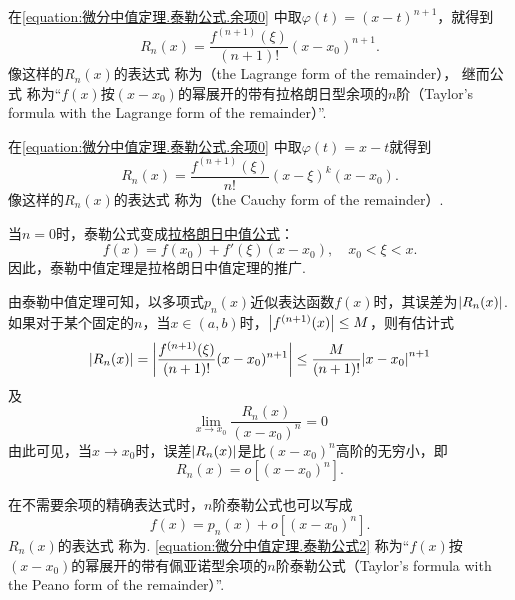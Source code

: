 在\cref{equation:微分中值定理.泰勒公式.余项0} 中取\(\varphi(t) = (x-t)^{n+1}\)，就得到
\begin{equation}\label{equation:微分中值定理.泰勒公式.余项1}
R_n(x) = \frac{f^{(n+1)}(\xi)}{(n+1)!} (x-x_0)^{n+1}.
\end{equation}
像这样的\(R_n(x)\)的表达式  称为（the Lagrange form of the remainder），
继而公式  称为“\(f(x)\)按\((x-x_0)\)的幂展开的带有拉格朗日型余项的\(n\)阶（Taylor's formula with the Lagrange form of the remainder）”.

在\cref{equation:微分中值定理.泰勒公式.余项0} 中取\(\varphi(t) = x-t\)就得到
\begin{equation}\label{equation:微分中值定理.泰勒公式.余项4}
R_n(x) = \frac{f^{(n+1)}(\xi)}{n!} (x-\xi)^k (x-x_0).
\end{equation}
像这样的\(R_n(x)\)的表达式  称为（the Cauchy form of the remainder）.

当\(n=0\)时，泰勒公式变成\hyperref[equation:微分中值定理.拉格朗日中值公式]{拉格朗日中值公式}：\[
f(x) = f(x_0) + f'(\xi) (x-x_0), \quad x_0 < \xi < x.
\]因此，泰勒中值定理是拉格朗日中值定理的推广.

由泰勒中值定理可知，以多项式\(p_n(x)\)近似表达函数\(f(x)\)时，其误差为\(\abs{R_n(x)}\).如果对于某个固定的\(n\)，当\(x\in(a,b)\)时，\(\abs{f^{(n+1)}(x)} \leq M\)，则有估计式\begin{equation}\label{equation:微分中值定理.泰勒公式.误差1}
\abs{R_n(x)}
= \abs{\frac{f^{(n+1)}(\xi)}{(n+1)!} (x-x_0)^{n+1}}
\leq \frac{M}{(n+1)!} \abs{x-x_0}^{n+1}
\end{equation}及\[
\lim\limits_{x \to x_0} \frac{R_n(x)}{(x-x_0)^n} = 0
\]由此可见，当\(x \to x_0\)时，误差\(\abs{R_n(x)}\)是比\((x-x_0)^n\)高阶的无穷小，即\begin{equation}\label{equation:微分中值定理.泰勒公式.余项2}
R_n(x) = o[(x-x_0)^n].
\end{equation}

在不需要余项的精确表达式时，\(n\)阶泰勒公式也可以写成
\begin{equation}\label{equation:微分中值定理.泰勒公式2}
f(x) = p_n(x) + o[(x - x_0)^n].
\end{equation}
\(R_n(x)\)的表达式  称为.
\cref{equation:微分中值定理.泰勒公式2} 称为“\(f(x)\)按\((x-x_0)\)的幂展开的带有佩亚诺型余项的\(n\)阶泰勒公式（Taylor's formula with the Peano form of the remainder）”.

